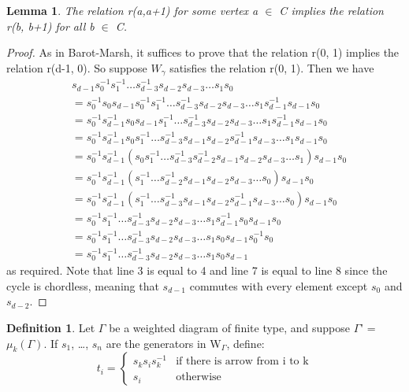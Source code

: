 \documentclass[11pt]{amsart}
\newtheorem{lem}[thm]{Lemma}
\theoremstyle{definition}
\newtheorem{defn}[thm]{Definition}
\begin{document}
\begin{lem}
The relation r(a,a+1) for some vertex a $\in$ C implies the relation r(b, b+1) for all b $\in$ C.
\end{lem}
\begin{proof}
As in Barot-Marsh, it suffices to prove that the relation r(0, 1) implies the relation r(d-1, 0). So suppose $W_{\gamma}$ satisfies the relation r(0, 1). Then we have 
\begin{align*}
& s_{d-1}s_{0}^{-1}s_{1}^{-1}\dots s_{d-3}^{-1}s_{d-2}s_{d-3}\dots s_1s_0 \\
&= s_{0}^{-1}s_{0}s_{d-1}s_{0}^{-1}s_{1}^{-1}\dots s_{d-3}^{-1}s_{d-2}s_{d-3}\dots s_{1}s_{d-1}^{-1}s_{d-1}s_{0} \\
&= s_{0}^{-1}s_{d-1}^{-1}s_{0}s_{d-1}s_{1}^{-1}\dots s_{d-3}^{-1}s_{d-2}s_{d-3}\dots s_{1}s_{d-1}^{-1}s_{d-1}s_{0} \\
&= s_{0}^{-1}s_{d-1}^{-1}s_{0}s_{1}^{-1}\dots s_{d-3}^{-1}s_{d-1}s_{d-2}s_{d-1}^{-1}s_{d-3}\dots s_{1}s_{d-1}s_{0} \\
&= s_{0}^{-1}s_{d-1}^{-1}(s_{0}s_{1}^{-1}\dots s_{d-3}^{-1}s_{d-2}^{-1}s_{d-1}s_{d-2}s_{d-3}\dots s_{1})s_{d-1}s_{0} \\
&= s_{0}^{-1}s_{d-1}^{-1}(s_{1}^{-1} \dots s_{d-2}^{-1}s_{d-1}s_{d-2}s_{d-3}\dots s_{0})s_{d-1}s_{0} \\
&= s_{0}^{-1}s_{d-1}^{-1}(s_{1}^{-1} \dots s_{d-3}^{-1}s_{d-1}s_{d-2}s_{d-1}^{-1}s_{d-3}\dots s_{0})s_{d-1}s_{0} \\
&= s_{0}^{-1}s_{1}^{-1}\dots s_{d-3}^{-1}s_{d-2}s_{d-3}\dots s_{1}s_{d-1}^{-1}s_{0}s_{d-1}s_{0} \\
&= s_{0}^{-1}s_{1}^{-1}\dots s_{d-3}^{-1}s_{d-2}s_{d-3}\dots s_{1}s_{0}s_{d-1}s_{0}^{-1}s_{0} \\
&= s_{0}^{-1}s_{1}^{-1}\dots s_{d-3}^{-1}s_{d-2}s_{d-3}\dots s_{1}s_{0}s_{d-1} 
\end{align*}
as required. Note that line 3 is equal to 4 and line 7 is equal to line 8 since the cycle is chordless, meaning that $s_{d-1}$ commutes with every element except $s_{0}$ and $s_{d-2}$.
\end{proof}

\begin{defn} Let $\Gamma$ be a weighted diagram of finite type, and suppose $\Gamma$' = $\mu_{k}(\Gamma)$. If $s_1$, \dots, $s_n$ are the generators in W$_{\Gamma}$, define: 
$$t_{i} =
\begin{cases}
s_{k}s_{i}s_{k}^{-1} & \text{if there is arrow from i to k} \\
s_{i} & \text{otherwise}
\end{cases}$$
\end{defn}
\end{document}
